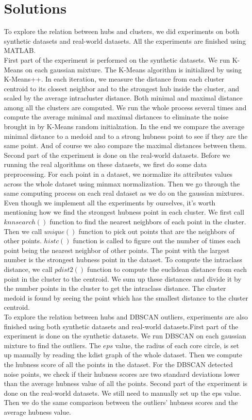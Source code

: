 \documentclass[11pt]{article}
\begin{document}
\section{Solutions}
To explore the relation between hubs and clusters, we did experiments on both synthetic datasets and real-world datasets. All the experiments are finished using MATLAB.\\
First part of the experiment is performed on the synthetic datasets. We run K-Means on each gaussian mixture. The K-Means algorithm is initialized by using K-Means++. In each iteration, we measure the distance from each cluster centroid to its closest neighbor and to the strongest hub inside the cluster, and scaled by the average intracluster distance. Both minimal and maximal distance among all the clusters are computed. We run the whole process several times and compute the average minimal and maximal distances to eliminate the noise brought in by K-Means random initialzation. In the end we compare the average minimal distance to a medoid and to a strong hubness point to see if they are the same point. And of course we also compare the maximal distances between them. Second part of the experiment is done on the real-world datasets. Before we running the real algorithms on these datasets, we first do some data preprocessing. For each point in a dataset, we normalize its attributes values across the whole dataset using minmax normalization. Then we go through the same computing process on each real dataset as we do on the gaussian mixtures. \\Even though we implement all the experiments by ourselves, it's worth mentioning how we find the strongest hubness point in each cluster. We first call $knnsearch()$ function to find the nearest neighbors of each point in the cluster. Then we call $unique()$ function to pick out points that are the neighbors of other points. $histc()$ function is called to figure out the number of times each point being the nearest neighbor of other points. The point with the largest number is the strongest hubness point in the dataset. To compute the intraclass distance, we call $pdist2()$ function to compute the euclidean distance from each point in the cluster to the centroid. We sum up these distances and divide it by the number points in the cluster to get the intraclass distance. The cluster medoid is found by seeing the point which has the smallest distance to the cluster centroid.\\
To explore the relation between hubs and DBSCAN outliers, experiments are also finished using both synthetic datasets and real-world datasets.First part of the experiment is done on the synthetic datasets. We run DBSCAN on each gaussian mixture to find the outliers. The $eps$ value, the radius of each core circle, is set up manually by reading the kdist graph of the whole dataset. Then we compute the hubness score of all the points in the dataset. For the DBSCAN detected noise points, we check if their hubness scores are two standard deviations lower than the average hubness value of all the points. Second part of the experiment is done on the real-world datasets. We still need to manually set up the eps value. Then we do the same comparison between the outliers’ hubness scores and the average hubness value.\\
\end{document}
